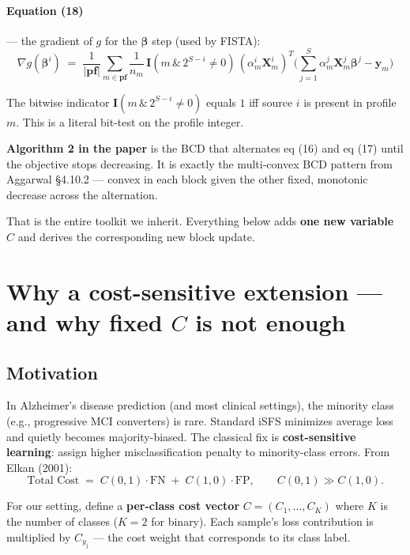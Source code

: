 \documentclass[11pt,a4paper]{article}
\begin{document}
\paragraph{Equation (18)} --- the gradient of $g$ for the $\boldsymbol{\beta}$ step (used by FISTA):
\begin{equation}
\nabla g(\boldsymbol{\beta}^{i}) \;=\; \frac{1}{|\mathbf{pf}|}\sum_{m \in \mathbf{pf}}\frac{1}{n_m}\,\mathbf{I}\!\left(m\,\&\,2^{S-i}\neq 0\right)\,(\alpha^{i}_{m}\mathbf{X}^{i}_{m})^{T}\!\Big(\sum_{j=1}^{S}\alpha^{j}_{m}\mathbf{X}^{j}_{m}\boldsymbol{\beta}^{j} - \mathbf{y}_m\Big)
\end{equation}

The bitwise indicator $\mathbf{I}(m \,\&\, 2^{S-i} \neq 0)$ equals $1$ iff source $i$ is present in profile $m$. This is a literal bit-test on the profile integer.

\textbf{Algorithm 2 in the paper} is the BCD that alternates eq (16) and eq (17) until the objective stops decreasing. It is exactly the multi-convex BCD pattern from Aggarwal \S 4.10.2 --- convex in each block given the other fixed, monotonic decrease across the alternation.

That is the entire toolkit we inherit. Everything below adds \textbf{one new variable $C$} and derives the corresponding new block update.

\section{Why a cost-sensitive extension --- and why fixed $C$ is not enough}

\subsection{Motivation}

In Alzheimer's disease prediction (and most clinical settings), the minority class (e.g., progressive MCI converters) is rare. Standard iSFS minimizes average loss and quietly becomes majority-biased. The classical fix is \textbf{cost-sensitive learning}: assign higher misclassification penalty to minority-class errors. From Elkan (2001):
\[
\text{Total Cost} \;=\; C(0,1)\cdot\text{FN} \;+\; C(1,0)\cdot\text{FP},\qquad C(0,1) \gg C(1,0).
\]

For our setting, define a \textbf{per-class cost vector} $C = (C_1, \ldots, C_K)$ where $K$ is the number of classes ($K = 2$ for binary). Each sample's loss contribution is multiplied by $C_{y_j}$ --- the cost weight that corresponds to its class label.
\end{document}
